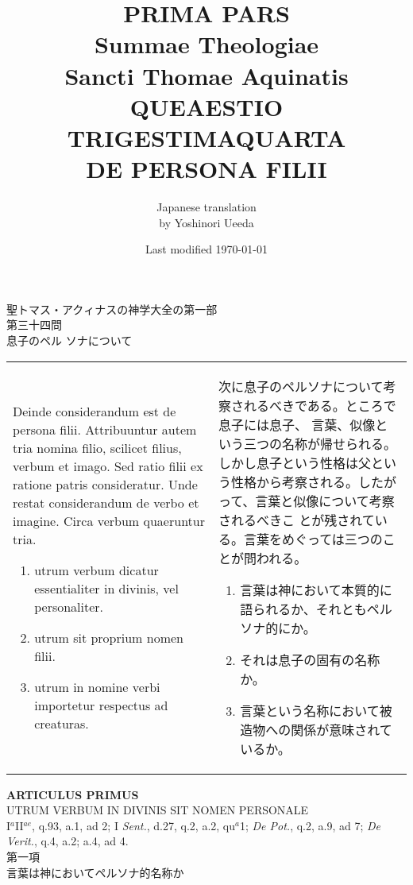 \documentclass[10pt]{jsarticle} %
\title{{\bf PRIMA PARS}\\{\HUGE Summae Theologiae}\\Sancti Thomae
Aquinatis\\{\sffamily QUEAESTIO TRIGESTIMAQUARTA}\\DE PERSONA FILII}
\author{Japanese translation\\by Yoshinori {\sc Ueeda}}
\date{Last modified \today}
\begin{document}
\maketitle

\thispagestyle{empty}
\begin{center}
{\Large 聖トマス・アクィナスの神学大全の第一部\\第三十四問\\息子のペル
 ソナについて}
\end{center}



\begin{longtable}{p{21em}p{21em}}
{\Huge D}einde considerandum est de persona filii. Attribuuntur autem tria
 nomina filio, scilicet filius, verbum et imago. Sed ratio filii ex
 ratione patris consideratur. Unde restat considerandum de verbo et
 imagine. Circa verbum quaeruntur tria. 


\begin{enumerate}
 \item utrum verbum dicatur essentialiter in divinis, vel
       personaliter.
 \item utrum sit proprium nomen filii. 
 \item utrum in nomine verbi importetur respectus ad creaturas.
\end{enumerate}

&

次に息子のペルソナについて考察されるべきである。ところで息子には息子、
 言葉、似像という三つの名称が帰せられる。しかし息子という性格は父とい
 う性格から考察される。したがって、言葉と似像について考察されるべきこ
 とが残されている。言葉をめぐっては三つのことが問われる。

\begin{enumerate}
 \item 言葉は神において本質的に語られるか、それともペルソナ的にか。
 \item それは息子の固有の名称か。
 \item 言葉という名称において被造物への関係が意味されているか。
\end{enumerate}

\end{longtable}

\newpage

\begin{center}
{\Large {\bf ARTICULUS PRIMUS}}\\
{\large UTRUM VERBUM IN DIVINIS SIT NOMEN PERSONALE}\\
{\footnotesize I$^{a}$II$^{ae}$, q.93, a.1, ad 2; I {\itshape Sent.},
 d.27, q.2, a.2, qu$^{a}$1; {\itshape De Pot.}, q.2, a.9, ad 7;
 {\itshape De Verit.}, q.4, a.2; a.4, ad 4.}\\
{\Large 第一項\\言葉は神においてペルソナ的名称か}
\end{center}
\end{document}
